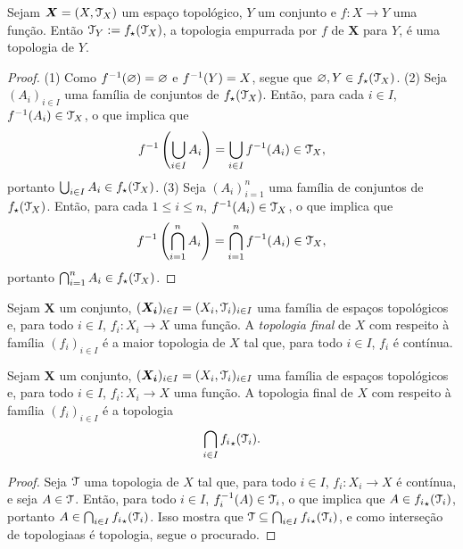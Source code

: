 \begin{prop}
Sejam $\bm X = (X,\mathcal{T}_X)$ um espaço topológico, $Y$ um conjunto e $f: X \to Y$ uma função. Então $\mathcal{T}_Y := f_\star(\mathcal{T}_X)$, a topologia empurrada por $f$ de $\bm X$ para $Y$, é uma topologia de $Y$.
\end{prop}
\begin{proof}
(1) Como $f^{-1}(\varnothing)=\varnothing$ e $f^{-1}(Y)=X$, segue que $\varnothing,Y \in f_\star(\mathcal{T}_X)$. (2) Seja $(A_i)_{i \in I}$ uma família de conjuntos de $f_\star(\mathcal{T}_X)$. Então, para cada $i \in I$, $f^{-1}(A_i) \in \mathcal{T}_X$, o que implica que
\begin{equation*}
	f^{-1} \left( \bigcup_{i \in I} A_i \right) = \bigcup_{i \in I} f^{-1}(A_i) \in \mathcal{T}_X,
	\end{equation*}
portanto $\bigcup_{i \in I} A_i \in f_\star(\mathcal{T}_X)$. (3) Seja $(A_i)_{i=1}^n$ uma família de conjuntos de $f_\star(\mathcal{T}_X)$. Então, para cada $1 \leq i \leq n$, $f^{-1}(A_i) \in \mathcal{T}_X$, o que implica que
\begin{equation*}
	f^{-1} \left( \bigcap_{i=1}^n A_i \right) = \bigcap_{i=1}^n f^{-1}(A_i) \in \mathcal{T}_X,
	\end{equation*}
portanto $\bigcap_{i=1}^n A_i \in f_\star(\mathcal{T}_X)$.
\end{proof}

\begin{defi}
Sejam $\bm X$ um conjunto, $(\bm{X_i})_{i \in I} = (X_i,\mathcal{T}_i)_{i \in I}$ uma família de espaços topológicos e, para todo $i \in I$, $f_i: X_i \to X$ uma função. A \emph{topologia final} de $X$ com respeito à família $(f_i)_{i \in I}$ é a maior topologia de $X$ tal que, para todo $i \in I$, $f_i$ é contínua.
\end{defi}

\begin{prop}
Sejam $\bm X$ um conjunto, $(\bm{X_i})_{i \in I} = (X_i,\mathcal{T}_i)_{i \in I}$ uma família de espaços topológicos e, para todo $i \in I$, $f_i: X_i \to X$ uma função. A topologia final de $X$ com respeito à família $(f_i)_{i \in I}$ é a topologia
	\begin{equation*}
	\bigcap_{i \in I} {f_i}_\star(\mathcal{T}_i).
	\end{equation*}
\end{prop}
\begin{proof}
Seja $\mathcal{T}$ uma topologia de $X$ tal que, para todo $i \in I$, $f_i: X_i \to X$ é contínua, e seja $A \in \mathcal{T}$. Então, para todo $i \in I$, $f_i ^{-1}(A) \in \mathcal{T}_i$, o que implica que $A \in {f_i}_\star(\mathcal{T}_i)$, portanto $A \in \bigcap_{i \in I} {f_i}_\star(\mathcal{T}_i)$. Isso mostra que $\mathcal{T} \subseteq \bigcap_{i \in I} {f_i}_\star(\mathcal{T}_i)$, e como interseção de topologiaas é topologia, segue o procurado.
\end{proof}

